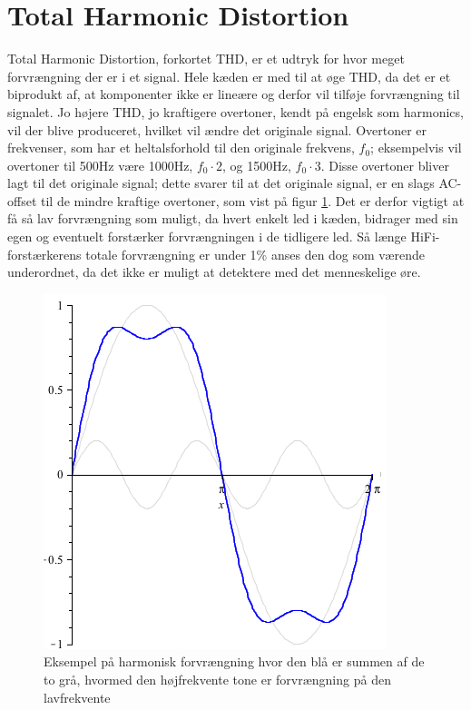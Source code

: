 \section{Total Harmonic Distortion}
\label{thd}
Total Harmonic Distortion, forkortet THD, er et udtryk for hvor meget forvrængning der er i et signal.  Hele kæden er med til at øge THD, da det er et biprodukt af, at komponenter ikke er lineære og derfor vil tilføje forvrængning til signalet. Jo højere THD, jo kraftigere overtoner, kendt på engelsk som harmonics, vil der blive produceret, hvilket vil ændre det originale signal. Overtoner er frekvenser, som har et heltalsforhold til den originale frekvens, $f_0$; eksempelvis vil overtoner til 500Hz være 1000Hz, $f_0\cdot2$, og 1500Hz, $f_0\cdot3$. Disse overtoner bliver lagt til det originale signal; dette svarer til at det originale signal, er en slags AC-offset til de mindre kraftige overtoner, som vist på figur \ref{fig:harmonic_distortion}. Det er derfor vigtigt at få så lav forvrængning som muligt, da hvert enkelt led i kæden, bidrager med sin egen og eventuelt forstærker forvrængningen i de tidligere led. Så længe HiFi-forstærkerens totale forvrængning er under 1\% anses den dog som værende underordnet, da det ikke er muligt at detektere med det menneskelige øre.

\begin{figure}[h]
\centering
\includegraphics[scale=.4]{valg_af_loesning/thd/thdsamlet.png}
\caption{Eksempel på harmonisk forvrængning hvor den blå er summen af de to grå, hvormed den højfrekvente tone er forvrængning på den lavfrekvente}
\label{fig:harmonic_distortion}
\end{figure}